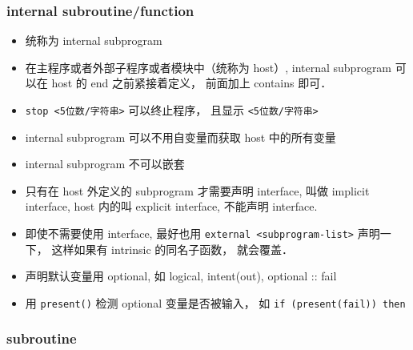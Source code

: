 \subsubsection{internal subroutine/function}
\begin{itemize}
\item 统称为 internal subprogram
\item 在主程序或者外部子程序或者模块中（统称为 host）, internal subprogram 可以在 host 的 end 之前紧接着定义， 前面加上 contains 即可．
\item \verb|stop <5位数/字符串>| 可以终止程序， 且显示 \verb|<5位数/字符串>|
\item internal subprogram 可以不用自变量而获取 host 中的所有变量
\item internal subprogram 不可以嵌套
\item 只有在 host 外定义的 subprogram 才需要声明 interface, 叫做 implicit interface, host 内的叫 explicit interface, 不能声明 interface.
\item 即使不需要使用 interface, 最好也用 \verb|external <subprogram-list>| 声明一下， 这样如果有 intrinsic 的同名子函数， 就会覆盖．
\item 声明默认变量用 optional, 如 logical, intent(out), optional :: fail
\item 用 \verb|present()| 检测 optional 变量是否被输入， 如 \verb|if (present(fail)) then|
\end{itemize}

\subsubsection{subroutine}

